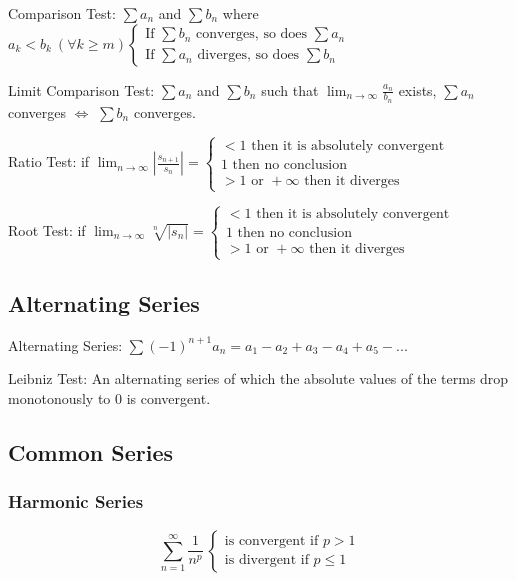 Comparison Test: $\sum a_n$ and $\sum b_n$ where $a_k<b_k ~ (\forall k\ge m) 
\begin{cases}
\text{If } \sum b_n \text{ converges, so does } \sum a_n \\
\text{If } \sum a_n \text{ diverges, so does } \sum b_n
\end{cases}
$

Limit Comparison Test: $\sum a_n$ and $\sum b_n$ such that $ \lim_{n\rightarrow\infty} \frac{a_n}{b_n}$ exists, $\sum a_n$ converges $\Leftrightarrow$ $\sum b_n$ converges.

Ratio Test: if $\lim_{n\rightarrow \infty}\left|\frac{s_{n+1}}{s_n}\right| = \begin{cases}
<1 \text{ then it is absolutely convergent} \\
1 \text{ then no conclusion} \\
>1 \text{ or } +\infty \text{ then it diverges}
\end{cases}
$

Root Test: if  $\lim_{n\rightarrow \infty} \sqrt[n]{\left|s_n\right|} = \begin{cases}
<1 \text{ then it is absolutely convergent} \\
1 \text{ then no conclusion} \\
>1 \text{ or } +\infty \text{ then it diverges}
\end{cases}
$

\subsection{Alternating Series}
Alternating Series: $ \sum(-1)^{n+1}a_n=a_1-a_2+a_3-a_4+a_5-... $

Leibniz Test: An alternating series of which the absolute values of the terms drop
monotonously to 0 is convergent.

\subsection{Common Series}
\subsubsection{Harmonic Series}
\[
\sum_{n=1}^\infty \frac{1}{n^p} ~ \begin{cases}
									\text{is convergent if } p>1 \\
									\text{is divergent if } p\leq1
									\end{cases}
\]

